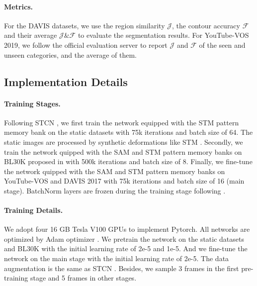 \documentclass[10pt,twocolumn,letterpaper]{article}
\begin{document}
\paragraph{Metrics.}
For the DAVIS datasets, we use the region similarity $\mathcal{J}$, the contour accuracy $\mathcal{F}$ and their average $\mathcal{J}\&\mathcal{F}$ to evaluate the segmentation results. For YouTube-VOS 2019, we follow the official evaluation server to report  $\mathcal{J}$ and $\mathcal{F}$ of the seen and unseen categories, and the average of them. 



\subsection{Implementation Details}
\paragraph{Training Stages.}
Following STCN \cite{cheng2021rethinking}, we first train the network equipped with the STM pattern memory bank on the static datasets \cite{wang2017learning,shi2015hierarchical,zeng2019towards,cheng2020cascadepsp,li2020fss} with 75k iterations and batch size of 64.  The static images are processed by synthetic deformations like STM \cite{oh2019video}. Secondly, we train the network quipped with the SAM and STM pattern memory banks on  BL30K \cite{chang2015shapenet,denninger2019blenderproc} proposed in \cite{cheng2021modular} with 500k iterations and batch size of 8. Finally, we fine-tune the network quipped with the SAM and STM pattern memory banks  on YouTube-VOS and DAVIS 2017 with 75k iterations and batch size of 16 (main stage). BatchNorm layers are frozen during the training stage following \cite{oh2019video}.
\vspace{-0.5em}
\paragraph{Training Details.} 
\label{sec:training details}
We adopt four 16 GB Tesla V100 GPUs to implement Pytorch. All networks are optimized by Adam optimizer \cite{kingma2014adam}. We pretrain the network on the static datasets and  BL30K  with the initial learning rate of 2e-5 and 1e-5. And we fine-tune the network on the main stage with the initial learning rate of 2e-5. The data augmentation is the same as STCN \cite{cheng2021rethinking}. Besides, we sample 3 frames in the first pre-training stage and 5 frames in other stages.
\vspace{-0.5em}
\end{document}
